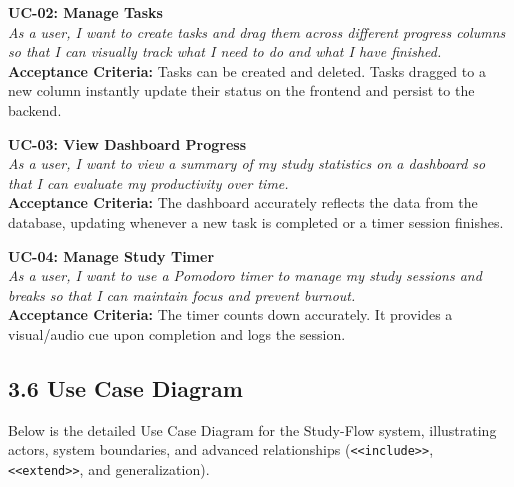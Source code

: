 \documentclass[12pt]{article}
\begin{document}
\vspace{0.3cm}
\noindent\textbf{UC-02: Manage Tasks} \\
\textit{As a user, I want to create tasks and drag them across different progress columns so that I can visually track what I need to do and what I have finished.} \\
\textbf{Acceptance Criteria:} Tasks can be created and deleted. Tasks dragged to a new column instantly update their status on the frontend and persist to the backend.

\vspace{0.3cm}
\noindent\textbf{UC-03: View Dashboard Progress} \\
\textit{As a user, I want to view a summary of my study statistics on a dashboard so that I can evaluate my productivity over time.} \\
\textbf{Acceptance Criteria:} The dashboard accurately reflects the data from the database, updating whenever a new task is completed or a timer session finishes.

\vspace{0.3cm}
\noindent\textbf{UC-04: Manage Study Timer} \\
\textit{As a user, I want to use a Pomodoro timer to manage my study sessions and breaks so that I can maintain focus and prevent burnout.} \\
\textbf{Acceptance Criteria:} The timer counts down accurately. It provides a visual/audio cue upon completion and logs the session.

\subsection*{3.6 Use Case Diagram}
Below is the detailed Use Case Diagram for the Study-Flow system, illustrating actors, system boundaries, and advanced relationships (\texttt{<<include>>}, \texttt{<<extend>>}, and generalization).
\end{document}
